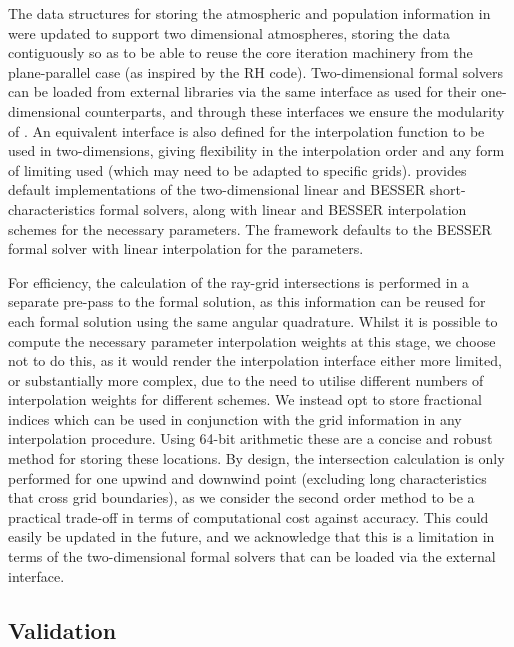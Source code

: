 The data structures for storing the atmospheric and population information in \Lw{} were updated to support two dimensional atmospheres, storing the data contiguously so as to be able to reuse the core iteration machinery from the plane-parallel case (as inspired by the RH code).
Two-dimensional formal solvers can be loaded from external libraries via the same interface as used for their one-dimensional counterparts, and through these interfaces we ensure the modularity of \Lw{}.
An equivalent interface is also defined for the interpolation function to be used in two-dimensions, giving flexibility in the interpolation order and any form of limiting used (which may need to be adapted to specific grids).
\Lw{} provides default implementations of the two-dimensional linear and BESSER short-characteristics formal solvers, along with linear and BESSER interpolation schemes for the necessary parameters.
The framework defaults to the BESSER formal solver with linear interpolation for the parameters.

For efficiency, the calculation of the ray-grid intersections is performed in a separate pre-pass to the formal solution, as this information can be reused for each formal solution using the same angular quadrature.
Whilst it is possible to compute the necessary parameter interpolation weights at this stage, we choose not to do this, as it would render the interpolation interface either more limited, or substantially more complex, due to the need to utilise different numbers of interpolation weights for different schemes.
We instead opt to store fractional indices which can be used in conjunction with the grid information in any interpolation procedure.
Using 64-bit arithmetic these are a concise and robust method for storing these locations.
By design, the intersection calculation is only performed for one upwind and downwind point
(excluding long characteristics that cross grid boundaries), as we consider the second order method to be a practical trade-off in terms of computational cost against accuracy.
This could easily be updated in the future, and we acknowledge that this is a limitation in terms of the two-dimensional formal solvers that can be loaded via the external interface.


\subsection{Validation}

